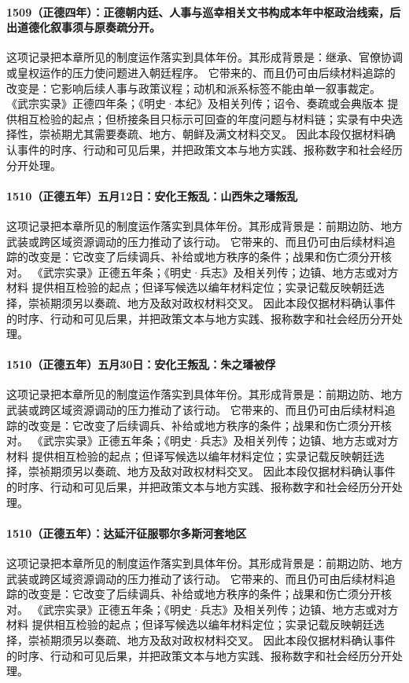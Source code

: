 \paragraph{1509（正德四年）：正德朝内廷、人事与巡幸相关文书构成本年中枢政治线索，后出道德化叙事须与原奏疏分开。} 这项记录把本章所见的制度运作落实到具体年份。其形成背景是：继承、官僚协调或皇权运作的压力使问题进入朝廷程序。 它带来的、而且仍可由后续材料追踪的改变是：它影响后续人事与政策议程；动机和派系标签不能由单一叙事裁定。 《武宗实录》正德四年条；《明史·本纪》及相关列传；诏令、奏疏或会典版本 提供相互检验的起点；但桥接条目只标示可回查的年度问题与材料链；实录有中央选择性，崇祯期尤其需要奏疏、地方、朝鲜及满文材料交叉。 因此本段仅据材料确认事件的时序、行动和可见后果，并把政策文本与地方实践、报称数字和社会经历分开处理。

\paragraph{1510（正德五年）五月12日：安化王叛乱：山西朱之璠叛乱} 这项记录把本章所见的制度运作落实到具体年份。其形成背景是：前期边防、地方武装或跨区域资源调动的压力推动了该行动。 它带来的、而且仍可由后续材料追踪的改变是：它改变了后续调兵、补给或地方秩序的条件；战果和伤亡须分开核对。 《武宗实录》正德五年条；《明史·兵志》及相关列传；边镇、地方志或对方材料 提供相互检验的起点；但译写候选以编年材料定位；实录记载反映朝廷选择，崇祯期须另以奏疏、地方及敌对政权材料交叉。 因此本段仅据材料确认事件的时序、行动和可见后果，并把政策文本与地方实践、报称数字和社会经历分开处理。

\paragraph{1510（正德五年）五月30日：安化王叛乱：朱之璠被俘} 这项记录把本章所见的制度运作落实到具体年份。其形成背景是：前期边防、地方武装或跨区域资源调动的压力推动了该行动。 它带来的、而且仍可由后续材料追踪的改变是：它改变了后续调兵、补给或地方秩序的条件；战果和伤亡须分开核对。 《武宗实录》正德五年条；《明史·兵志》及相关列传；边镇、地方志或对方材料 提供相互检验的起点；但译写候选以编年材料定位；实录记载反映朝廷选择，崇祯期须另以奏疏、地方及敌对政权材料交叉。 因此本段仅据材料确认事件的时序、行动和可见后果，并把政策文本与地方实践、报称数字和社会经历分开处理。

\paragraph{1510（正德五年）：达延汗征服鄂尔多斯河套地区} 这项记录把本章所见的制度运作落实到具体年份。其形成背景是：前期边防、地方武装或跨区域资源调动的压力推动了该行动。 它带来的、而且仍可由后续材料追踪的改变是：它改变了后续调兵、补给或地方秩序的条件；战果和伤亡须分开核对。 《武宗实录》正德五年条；《明史·兵志》及相关列传；边镇、地方志或对方材料 提供相互检验的起点；但译写候选以编年材料定位；实录记载反映朝廷选择，崇祯期须另以奏疏、地方及敌对政权材料交叉。 因此本段仅据材料确认事件的时序、行动和可见后果，并把政策文本与地方实践、报称数字和社会经历分开处理。

